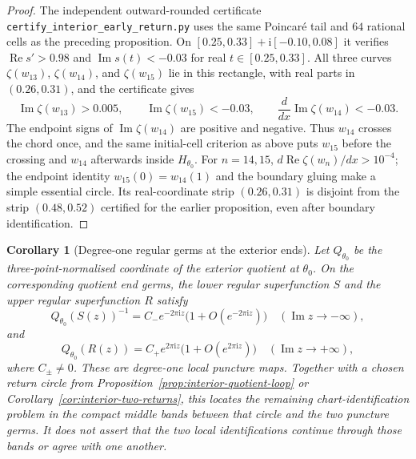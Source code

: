 \documentclass[11pt,a4paper]{article}
\newtheorem{corollary}[theorem]{Corollary}
\theoremstyle{definition}
\newcommand{\Rr}{R}
\newcommand{\ii}{\mathrm{i}}
\begin{document}
\begin{proof}
The independent outward-rounded certificate
\texttt{certify\_interior\_early\_return.py} uses the same Poincar\'e
tail and $64$ rational cells as the preceding proposition.  On
$[0.25,0.33]+\ii[-0.10,0.08]$ it verifies
$\operatorname{Re}s'>0.98$ and
$\operatorname{Im}s(t)<-0.03$ for real $t\in[0.25,0.33]$.
All three curves $\zeta(w_{13})$, $\zeta(w_{14})$, and
$\zeta(w_{15})$ lie in this rectangle, with real parts in
$(0.26,0.31)$, and the certificate gives
\[
 \operatorname{Im}\zeta(w_{13})>0.005,\qquad
 \operatorname{Im}\zeta(w_{15})<-0.03,\qquad
 \frac{d}{dx}\operatorname{Im}\zeta(w_{14})<-0.03.
\]
The endpoint signs of $\operatorname{Im}\zeta(w_{14})$ are positive
and negative.  Thus $w_{14}$ crosses the chord once, and the same
initial-cell criterion as above puts $w_{15}$ before the crossing
and $w_{14}$ afterwards inside $H_{\theta_0}$.  For $n=14,15$,
$d\operatorname{Re}\zeta(w_n)/dx>10^{-4}$; the endpoint identity
$w_{15}(0)=w_{14}(1)$ and the boundary gluing make a simple
essential circle.  Its real-coordinate strip $(0.26,0.31)$ is
disjoint from the strip $(0.48,0.52)$ certified for the earlier
proposition, even after boundary identification.
\end{proof}

\begin{corollary}[Degree-one regular germs at the exterior ends]
\label{cor:interior-end-germs}
Let $Q_{\theta_0}$ be the three-point-normalised coordinate of the
exterior quotient at $\theta_0$.  On the corresponding quotient end
germs, the lower regular superfunction $S$ and the upper regular
superfunction $\Rr$ satisfy
\[
 Q_{\theta_0}(S(z))^{-1}
   =C_-e^{-2\pi\ii z}
       \bigl(1+O(e^{-2\pi\ii z})\bigr)
       \quad(\operatorname{Im}z\to-\infty),
\]
and
\[
 Q_{\theta_0}(\Rr(z))
   =C_+e^{2\pi\ii z}
       \bigl(1+O(e^{2\pi\ii z})\bigr)
       \quad(\operatorname{Im}z\to+\infty),
\]
where $C_\pm\ne0$.  These are degree-one local puncture maps.
Together with a chosen return circle from
Proposition~\ref{prop:interior-quotient-loop} or
Corollary~\ref{cor:interior-two-returns}, this locates the remaining
chart-identification problem in the compact middle bands between
that circle and the two puncture germs.
It does not assert that the two local identifications continue
through those bands or agree with one another.
\end{corollary}
\end{document}
